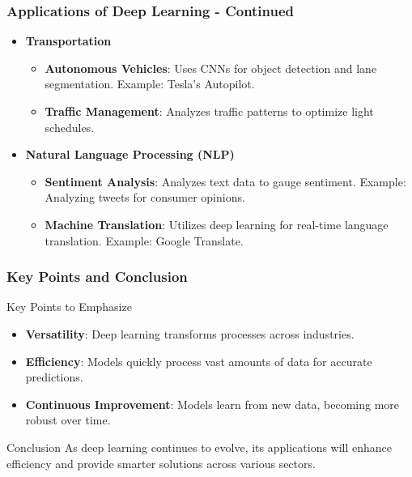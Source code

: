 \documentclass[aspectratio=169]{beamer}
\begin{document}
\begin{frame}[fragile]
    \frametitle{Applications of Deep Learning - Continued}
    \begin{itemize}
        \item \textbf{Transportation}
            \begin{itemize}
                \item \textbf{Autonomous Vehicles}: Uses CNNs for object detection and lane segmentation. Example: Tesla's Autopilot.
                \item \textbf{Traffic Management}: Analyzes traffic patterns to optimize light schedules.
            \end{itemize}
        
        \item \textbf{Natural Language Processing (NLP)}
            \begin{itemize}
                \item \textbf{Sentiment Analysis}: Analyzes text data to gauge sentiment. Example: Analyzing tweets for consumer opinions.
                \item \textbf{Machine Translation}: Utilizes deep learning for real-time language translation. Example: Google Translate.
            \end{itemize}
    \end{itemize}
\end{frame}

\begin{frame}[fragile]
    \frametitle{Key Points and Conclusion}
    \begin{block}{Key Points to Emphasize}
        \begin{itemize}
            \item \textbf{Versatility}: Deep learning transforms processes across industries.
            \item \textbf{Efficiency}: Models quickly process vast amounts of data for accurate predictions.
            \item \textbf{Continuous Improvement}: Models learn from new data, becoming more robust over time.
        \end{itemize}
    \end{block}

    \begin{block}{Conclusion}
        As deep learning continues to evolve, its applications will enhance efficiency and provide smarter solutions across various sectors.
    \end{block}
\end{frame}
\end{document}
